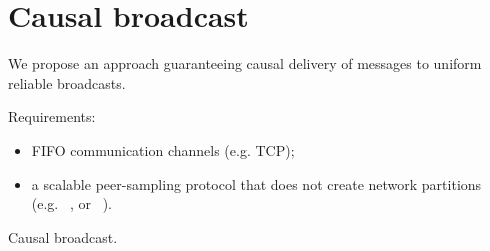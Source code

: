 
\section{Causal broadcast}
\label{sec:proposal}

We propose an approach guaranteeing causal delivery of messages to uniform reliable
broadcasts. 


Requirements:
\begin{itemize}
\item FIFO communication channels (e.g. TCP);
\item a scalable peer-sampling protocol that does not create network partitions
  (e.g. \SPRAY~\cite{nedelec2017adaptive}, or
  \CYCLON~\cite{voulgaris2005cyclon}).
\end{itemize}



\begin{algorithm*}[h]
  
  \caption{\label{algo:causalbroadcast}Causal broadcast.}
\end{algorithm*}


